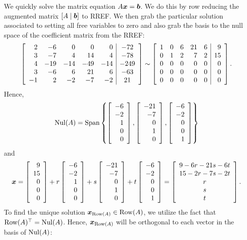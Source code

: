\begin{Exam}
We quickly solve the matrix equation $A\bb x=\bb b$. We do this by row reducing the augmented matrix $[A\mid \bb b]$ to RREF. We then grab the particular solution associated to setting all free variables to zero and also grab the basis to the null space of the coefficient matrix from the RREF:
\[\mtx{rrrrr|c}{2&-6&0&0&0&-72\\
3&-7&4&14&4&-78\\
4&-19&-14&-49&-14&-249\\
3&-6&6&21&6&-63\\
-1&2&-2&-7&-2&21} \sim \mtx{rrrrr|r}{1&0&6&21&6&9\\0&1&2&7&2&15\\0&0&0&0&0&0\\0&0&0&0&0&0\\0&0&0&0&0&0}.\] Hence,
\[\nul(A) = \Span\left\{\vr{-6\\-2\\1\\0\\0}, \vr{-21\\-7\\0\\1\\0}, \vr{-6\\-2\\0\\0\\1}\right\}\] and 
\[\bb x = \vr{9\\15\\0\\0\\0} + r\vr{-6\\-2\\1\\0\\0} +s \vr{-21\\-7\\0\\1\\0}+ t\vr{-6\\-2\\0\\0\\1} = \mtx{c}{9-6r-21s-6t\\15-2r-7s-2t\\r\\s\\t}.\] To find the unique solution $\bb x_{\row(A)}\in \row(A)$, we utilize the fact that $\row(A)^\top = \nul(A)$. Hence, $\bb x_{\row(A)}$ will be orthogonal to each vector in the basis of $\nul(A)$:
\begin{multline*}

\end{multline*}
\end{Exam}
